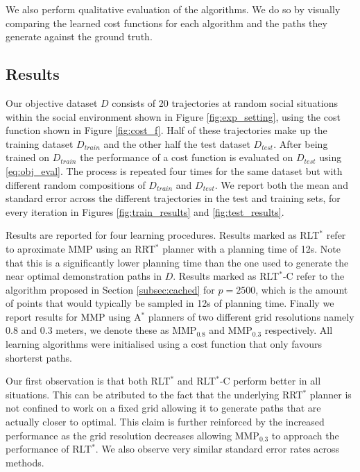 \documentclass{article}  %
\begin{document}
	We also perform qualitative evaluation of the algorithms. We do so by visually comparing the learned cost functions for each algorithm and the paths they generate against the ground truth.

	\subsection{Results}

	Our objective dataset $D$ consists of 20 trajectories at random social situations within the social environment shown in Figure \ref{fig:exp_setting}, using the cost function shown in Figure \ref{fig:cost_f}. Half of these trajectories make up the training dataset $D_{train}$ and the other half the test dataset $D_{test}$. After being trained on $D_{train}$ the performance of a cost function is evaluated on $D_{test}$ using \eqref{eq:obj_eval}. The process is repeated four times for the same dataset but with different random compositions of $D_{train}$ and $D_{test}$. We report both the mean and standard error across the different trajectories in the test and training sets, for every iteration in Figures \ref{fig:train_results} and \ref{fig:test_results}. 

	Results are reported for four learning procedures. Results marked as RLT$^*$ refer to aproximate MMP using an RRT$^*$ planner with a planning time of 12s. Note that this is a significantly lower planning time than the one used to generate the near optimal demonstration paths in $D$. Results marked as RLT$^*$-C refer to the algorithm proposed in Section \ref{subsec:cached} for $p=2500$, which is the amount of points that would typically be sampled in 12s of planning time. Finally we report results for MMP using A$^*$ planners of two different grid resolutions namely 0.8 and 0.3 meters, we denote these as MMP$_{0.8}$ and MMP$_{0.3}$ respectively. All learning algorithms were initialised using a cost function that only favours shorterst paths.

	Our first observation is that both RLT$^*$ and RLT$^*$-C perform better in all situations. This can be atributed to the fact that the underlying RRT$^*$ planner is not confined to work on a fixed grid allowing it to generate paths that are actually closer to optimal. This claim is further reinforced by the increased performance as the grid resolution decreases allowing MMP$_{0.3}$ to approach the performance of RLT$^*$. We also observe very similar standard error rates across methods.
\end{document}
